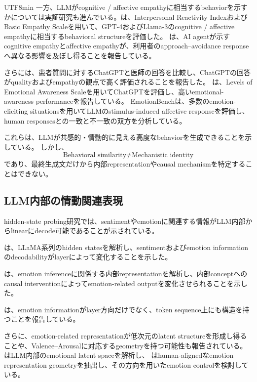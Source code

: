 \documentclass{article} %
\begin{document}
\begin{CJK*}{UTF8}{min}
一方、LLMがcognitive / affective empathyに相当するbehaviorを示すかについては実証研究も進んでいる。\citet{yu2025can}は、Interpersonal Reactivity IndexおよびBasic Empathy Scaleを用いて、GPT-4およびLlama-3のcognitive / affective empathyに相当するbehavioral structureを評価した\citep{yu2025can}。
\citet{zhang2025approach}は、AI agentが示すcognitive empathyとaffective empathyが、利用者のapproach--avoidance responseへ異なる影響を及ぼし得ることを報告している\citep{zhang2025approach}。

さらに\citet{ayers2023comparing}は、患者質問に対するChatGPTと医師の回答を比較し、ChatGPTの回答がqualityおよびempathyの観点で高く評価されることを報告した\citep{ayers2023comparing}。
\citet{elyoseph2023chatgpt}は、Levels of Emotional Awareness Scaleを用いてChatGPTを評価し、高いemotional-awareness performanceを報告している\citep{elyoseph2023chatgpt}。
EmotionBenchは、多数のemotion-eliciting situationsを用いてLLMのstimulus-induced affective responseを評価し、human responsesとの一致と不一致の双方を分析している\citep{huang2023emotionally}。

これらは、LLMが共感的・情動的に見える高度なbehaviorを生成できることを示している。
しかし、
\[
\text{Behavioral similarity}
\neq
\text{Mechanistic identity}
\]
であり、最終生成文だけから内部representationやcausal mechanismを特定することはできない。


\subsection{LLM内部の情動関連表現}

hidden-state probing研究では、sentimentやemotionに関連する情報がLLM内部からlinearにdecode可能であることが示されている。

\citet{di2025llamas}は、LLaMA系列のhidden statesを解析し、sentimentおよびemotion informationのdecodabilityがlayerによって変化することを示した\citep{di2025llamas}。

\citet{tak2025mechanistic}は、emotion inferenceに関係する内部representationを解析し、内部conceptへのcausal interventionによってemotion-related outputを変化させられることを示した\citep{tak2025mechanistic}。

\citet{zhang2025decoding}は、emotion informationがlayer方向だけでなく、token sequence上にも構造を持つことを報告している\citep{zhang2025decoding}。

さらに、emotion-related representationが低次元のlatent structureを形成し得ることや、Valence--Arousalに対応するgeometryを持つ可能性も報告されている。\citet{reichman2026emotions}はLLM内部のemotional latent spaceを解析し\citep{reichman2026emotions}、
\citet{wu2026decoding}はhuman-alignedなemotion representation geometryを抽出し、その方向を用いたemotion controlを検討している\citep{wu2026decoding}。


\end{CJK*}
\end{document}
